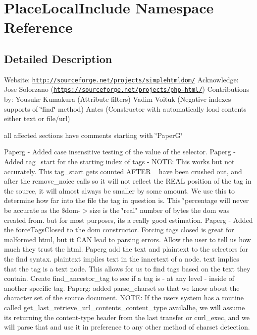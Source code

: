 \hypertarget{namespace_place_local_include}{}\section{Place\+Local\+Include Namespace Reference}
\label{namespace_place_local_include}


\subsection{Detailed Description}
Website\+: \href{http://sourceforge.net/projects/simplehtmldom/}{\tt http\+://sourceforge.\+net/projects/simplehtmldom/} Acknowledge\+: Jose Solorzano (\href{https://sourceforge.net/projects/php-html/}{\tt https\+://sourceforge.\+net/projects/php-\/html/}) Contributions by\+: Yousuke Kumakura (Attribute filters) Vadim Voituk (Negative indexes supports of \char`\"{}find\char`\"{} method) Antcs (Constructor with automatically load contents either text or file/url)

all affected sections have comments starting with \char`\"{}\+Paper\+G\char`\"{}

Paperg -\/ Added case insensitive testing of the value of the selector. Paperg -\/ Added tag\+\_\+start for the starting index of tags -\/ N\+O\+T\+E\+: This works but not accurately. This tag\+\_\+start gets counted A\+F\+T\+E\+R ~\newline
 have been crushed out, and after the remove\+\_\+noice calls so it will not reflect the R\+E\+A\+L position of the tag in the source, it will almost always be smaller by some amount. We use this to determine how far into the file the tag in question is. This \char`\"{}percentage will never be accurate as the \$dom-\/$>$size is the \char`\"{}real" number of bytes the dom was created from. but for most purposes, it\textquotesingle{}s a really good estimation. Paperg -\/ Added the force\+Tags\+Closed to the dom constructor. Forcing tags closed is great for malformed html, but it C\+A\+N lead to parsing errors. Allow the user to tell us how much they trust the html. Paperg add the text and plaintext to the selectors for the find syntax. plaintext implies text in the innertext of a node. text implies that the tag is a text node. This allows for us to find tags based on the text they contain. Create find\+\_\+ancestor\+\_\+tag to see if a tag is -\/ at any level -\/ inside of another specific tag. Paperg\+: added parse\+\_\+charset so that we know about the character set of the source document. N\+O\+T\+E\+: If the user\textquotesingle{}s system has a routine called get\+\_\+last\+\_\+retrieve\+\_\+url\+\_\+contents\+\_\+content\+\_\+type availalbe, we will assume it\textquotesingle{}s returning the content-\/type header from the last transfer or curl\+\_\+exec, and we will parse that and use it in preference to any other method of charset detection.

